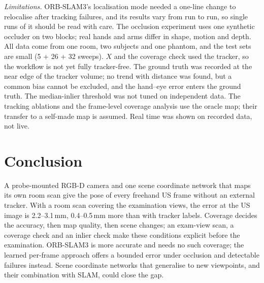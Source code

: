 \documentclass[9pt,shortpaper,twoside,web]{ieeecolor2}
\begin{document}
\emph{Limitations.} ORB-SLAM3's localisation mode needed a one-line change to relocalise after tracking failures, and its results vary from run to run, so single runs of it should be read with care. The occlusion experiment uses one synthetic occluder on two blocks; real hands and arms differ in shape, motion and depth. All data come from one room, two subjects and one phantom, and the test sets are small (5 + 26 + 32 sweeps). $X$ and the coverage check used the tracker, so the workflow is not yet fully tracker-free. The ground truth was recorded at the near edge of the tracker volume; no trend with distance was found, but a common bias cannot be excluded, and the hand--eye error enters the ground truth. The median-inlier threshold was not tuned on independent data. The tracking ablations and the frame-level coverage analysis use the oracle map; their transfer to a self-made map is assumed. Real time was shown on recorded data, not live.

\section{Conclusion}
A probe-mounted RGB-D camera and one scene coordinate network that maps its own room scan give the pose of every freehand US frame without an external tracker. With a room scan covering the examination views, the error at the US image is 2.2--3.1\,mm, 0.4--0.5\,mm more than with tracker labels. Coverage decides the accuracy, then map quality, then scene changes; an exam-view scan, a coverage check and an inlier check make these conditions explicit before the examination. ORB-SLAM3 is more accurate and needs no such coverage; the learned per-frame approach offers a bounded error under occlusion and detectable failures instead. Scene coordinate networks that generalise to new viewpoints, and their combination with SLAM, could close the gap.







\end{document}
